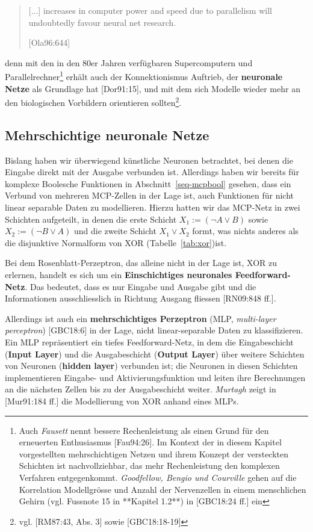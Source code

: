 \blockquote[{[Ola96:644]}]{
    [...] increases in computer power and speed due to parallelism will undoubtedly favour neural net research.
}

denn mit den in den 80er Jahren verfügbaren Supercomputern und Parallelrechner\footnote{
    Auch \textit{Fausett} nennt bessere Rechenleistung als einen Grund für den erneuerten Enthusiasmus [Fau94:26]. Im Kontext der in diesem Kapitel vorgestellten mehrschichtigen Netzen und ihrem Konzept der versteckten Schichten ist nachvollziehbar, das mehr Rechenleistung den komplexen Verfahren entgegenkommt. \textit{Goodfellow, Bengio und Courville} gehen auf die Korrelation Modellgrösse und Anzahl der Nervenzellen in einem menschlichen Gehirn (vgl. Fussnote 15 in **Kapitel 1.2**) in [GBC18:24 ff.] ein
} erhält auch der Konnektionismus Auftrieb, der \textbf{neuronale Netze} als Grundlage hat [Dor91:15], und mit dem sich Modelle wieder mehr an den biologischen Vorbildern orientieren sollten\footnote{
    vgl. [RM87:43, Abs. 3] sowie [GBC18:18-19]}.


\subsection{Mehrschichtige neuronale Netze}

Bislang haben wir überwiegend künstliche Neuronen betrachtet, bei denen die Eingabe direkt mit der Ausgabe verbunden ist. Allerdings haben wir bereits für komplexe Boolesche Funktionen in Abschnitt~\ref{seq-mcpbool} gesehen, dass ein Verbund von mehreren MCP-Zellen in der Lage ist, auch Funktionen für nicht linear separable Daten zu modellieren. Hierzu hatten wir das MCP-Netz in zwei Schichten aufgeteilt, in denen die erste Schicht $X_1 := (\neg A \lor B)$ sowie $X_2 := (\neg B \lor A)$ und die zweite Schicht $X_1 \lor X_2$ formt, was nichts anderes als die disjunktive Normalform von XOR (Tabelle~\ref{tab:xor})ist.

Bei dem Rosenblatt-Perzeptron, das alleine nicht in der Lage ist, XOR zu erlernen, handelt es sich um ein \textbf{Einschichtiges neuronales Feedforward-Netz}.
Das bedeutet, dass es nur Eingabe und Ausgabe gibt und die Informationen ausschliesslich in Richtung Ausgang fliessen [RN09:848 ff.].

Allerdings ist auch ein \textbf{mehrschichtiges Perzeptron} (MLP, \textit{multi-layer perceptron}) [GBC18:6] in der Lage, nicht linear-separable Daten zu klassifizieren.
Ein MLP repräsentiert ein tiefes Feedforward-Netz, in dem die Eingabeschicht (\textbf{Input Layer}) und die Ausgabeschicht (\textbf{Output Layer}) über weitere Schichten von Neuronen (\textbf{hidden layer}) verbunden ist; die Neuronen in diesen Schichten implementieren Eingabe- und Aktivierungsfunktion und leiten ihre Berechnungen an die nächsten Zellen bis zu der Ausgabeschicht weiter. \textit{Murtagh} zeigt in [Mur91:184 ff.] die Modellierung von XOR anhand eines MLPs.


